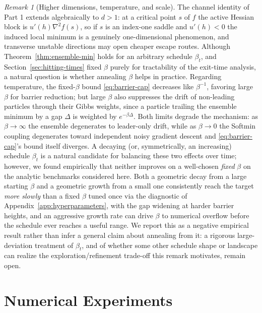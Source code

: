 \documentclass{article}
\theoremstyle{plain}
\theoremstyle{definition}
\theoremstyle{remark}
\newtheorem{remark}[theorem]{Remark}
\begin{document}
\begin{remark}[Higher dimensions, temperature, and scale]
\label{rem:higher-dim}
The channel identity of Part 1 extends algebraically to $d>1$: at a critical point $s$ of $f$ the active Hessian block is $u'(h)\nabla^2 f(s)$, so if $s$ is an index-one saddle and $u'(h)<0$ the induced local minimum is a genuinely one-dimensional phenomenon, and transverse unstable directions may open cheaper escape routes. Although Theorem~\ref{thm:ensemble-min} holds for an arbitrary schedule $\beta_t$, and Section~\ref{sec:hitting-times} fixed $\beta$ purely for tractability of the exit-time analysis, a natural question is whether annealing $\beta$ helps in practice. Regarding temperature, the fixed-$\beta$ bound \eqref{eq:barrier-cap} decreases like $\beta^{-1}$, favoring large $\beta$ for barrier reduction; but large $\beta$ also suppresses the drift of non-leading particles through their Gibbs weights, since a particle trailing the ensemble minimum by a gap $\Delta$ is weighted by $e^{-\beta\Delta}$. Both limits degrade the mechanism: as $\beta\to\infty$ the ensemble degenerates to leader-only drift, while as $\beta\to0$ the Softmin coupling degenerates toward independent noisy gradient descent and \eqref{eq:barrier-cap}'s bound itself diverges. A decaying (or, symmetrically, an increasing) schedule $\beta_t$ is a natural candidate for balancing these two effects over time; however, we found empirically that neither improves on a well-chosen \emph{fixed} $\beta$ on the analytic benchmarks considered here. Both a geometric decay from a large starting $\beta$ and a geometric growth from a small one consistently reach the target \emph{more slowly} than a fixed $\beta$ tuned once via the diagnostic of Appendix~\ref{app:hyperparameters}, with the gap widening at harder barrier heights, and an aggressive growth rate can drive $\beta$ to numerical overflow before the schedule ever reaches a useful range. We report this as a negative empirical result rather than infer a general claim about annealing from it: a rigorous large-deviation treatment of $\beta_t$, and of whether some other schedule shape or landscape can realize the exploration/refinement trade-off this remark motivates, remain open.
\end{remark}

\section{Numerical Experiments}
\label{sec:numerical-experiments}
\end{document}
